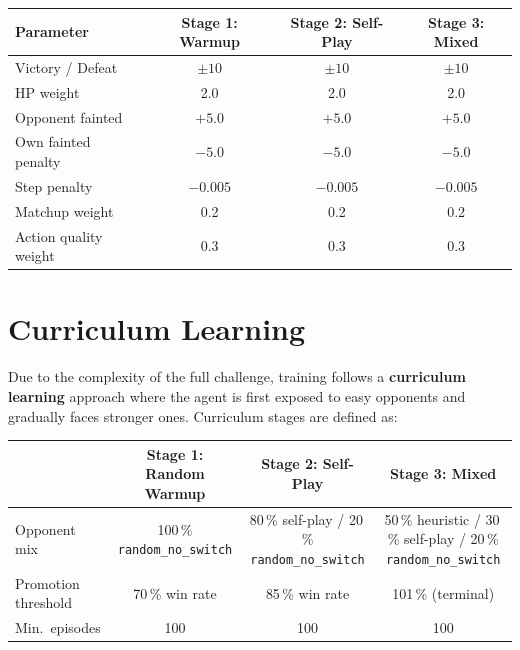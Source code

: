 \begin{center}
\small
\begin{tabularx}{0.95\textwidth}{l c c c}
  \toprule
  \textbf{Parameter} & \textbf{Stage 1: Warmup} & \textbf{Stage 2: Self-Play} & \textbf{Stage 3: Mixed} \\
  \midrule
  Victory / Defeat       & $\pm 10$ & $\pm 10$ & $\pm 10$ \\
  HP weight              & 2.0      & 2.0      & 2.0      \\
  Opponent fainted       & $+5.0$   & $+5.0$   & $+5.0$   \\
  Own fainted penalty    & $-5.0$   & $-5.0$   & $-5.0$   \\
  Step penalty           & $-0.005$ & $-0.005$ & $-0.005$ \\
  Matchup weight         & 0.2      & 0.2      & 0.2      \\
  Action quality weight  & 0.3      & 0.3      & 0.3      \\
  \bottomrule
\end{tabularx}
\end{center}

\section{Curriculum Learning}
\label{sec:curriculum}

Due to the complexity of the full challenge, training follows a \textbf{curriculum
learning} approach where the agent is first exposed to easy opponents and
gradually faces stronger ones.  Curriculum stages are defined as:

\begin{center}
\small
\begin{tabularx}{\textwidth}{l c c c}
  \toprule
  & \textbf{Stage 1: Random Warmup} & \textbf{Stage 2: Self-Play} & \textbf{Stage 3: Mixed} \\
  \midrule
  Opponent mix &
    100\,\% \texttt{random\_no\_switch} &
    80\,\% self-play / 20\,\% \texttt{random\_no\_switch} &
    50\,\% heuristic / 30\,\% self-play / 20\,\% \texttt{random\_no\_switch} \\[4pt]
  Promotion threshold &
    70\,\% win rate &
    85\,\% win rate &
    101\,\% (terminal) \\[4pt]
  Min.\ episodes &
    100 &
    100 &
    100 \\
  \bottomrule
\end{tabularx}
\end{center}


